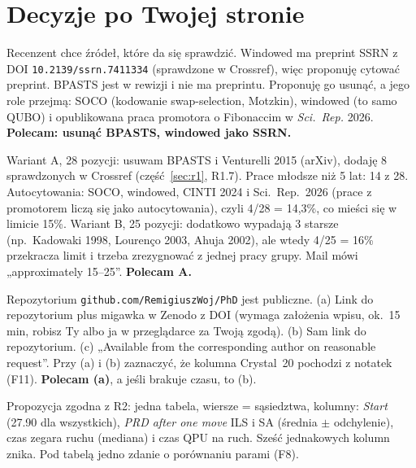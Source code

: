 \documentclass[11pt,a4paper]{article}
\begin{document}
\section{Decyzje po Twojej stronie}\label{sec:dec}

\begin{description}[leftmargin=0pt,style=nextline]
\item[D1. Prace „under review” {[18]} BPASTS i {[20]} C\&OR.]
Recenzent chce źródeł, które da się sprawdzić. Windowed ma preprint SSRN z DOI \texttt{10.2139/ssrn.7411334} (sprawdzone w Crossref), więc proponuję cytować preprint. BPASTS jest w rewizji i nie ma preprintu. Proponuję go usunąć, a jego role przejmą: SOCO (kodowanie swap-selection, Motzkin), windowed (to samo QUBO) i opublikowana praca promotora o Fibonaccim w \emph{Sci.\ Rep.} 2026. \textbf{Polecam: usunąć BPASTS, windowed jako SSRN.}

\item[D2. Liczba pozycji i autocytowania.]
Wariant A, 28 pozycji: usuwam BPASTS i Venturelli 2015 (arXiv), dodaję 8 sprawdzonych w Crossref (część~\ref{sec:r1}, R1.7). Prace młodsze niż 5 lat: 14 z 28. Autocytowania: SOCO, windowed, CINTI 2024 i Sci.\ Rep.\ 2026 (prace z promotorem liczą się jako autocytowania), czyli 4/28 = 14,3\%, co mieści się w limicie 15\%. Wariant B, 25 pozycji: dodatkowo wypadają 3 starsze (np.\ Kadowaki 1998, Louren\c{c}o 2003, Ahuja 2002), ale wtedy 4/25 = 16\% przekracza limit i trzeba zrezygnować z jednej pracy grupy. Mail mówi „approximately 15–25”. \textbf{Polecam A.}

\item[D3. Dostępność kodu i danych.]
Repozytorium \texttt{github.com/RemigiuszWoj/PhD} jest publiczne. (a) Link do repozytorium plus migawka w Zenodo z DOI (wymaga założenia wpisu, ok.\ 15 min, robisz Ty albo ja w przeglądarce za Twoją zgodą). (b) Sam link do repozytorium. (c) „Available from the corresponding author on reasonable request”. Przy (a) i (b) zaznaczyć, że kolumna Crystal~20 pochodzi z notatek (F11). \textbf{Polecam (a)}, a jeśli brakuje czasu, to (b).

\item[D4. Postać Tab.~2.]
Propozycja zgodna z R2: jedna tabela, wiersze = sąsiedztwa, kolumny: \emph{Start} (27.90 dla wszystkich), \emph{PRD after one move} ILS i SA (średnia $\pm$ odchylenie), czas zegara ruchu (mediana) i czas QPU na ruch. Sześć jednakowych kolumn znika. Pod tabelą jedno zdanie o porównaniu parami (F8).


\end{description}
\end{document}
